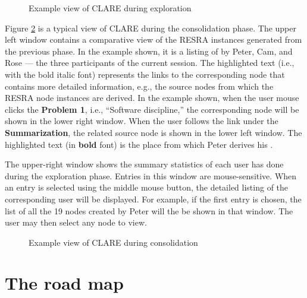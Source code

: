\begin{figure}[htb]
  \centerline{}
  \caption{Example view of CLARE during exploration}
  \label{fig:explore}
\end{figure}

Figure \ref{fig:consolidate} is a typical view of CLARE during the
consolidation phase. The upper left window contains a comparative view of
the RESRA instances generated from the previous phase. In the example
shown, it is a listing of  by Peter, Cam, and Rose
 --- the three participants of the current session.  The highlighted text
(i.e., with the bold italic font) represents the links to the corresponding
node that contains more detailed information, e.g., the source nodes from
which the RESRA node instances are derived. In the example shown, when the
user mouse clicks the {\bf Problem 1}, i.e., ``Software discipline,'' the
corresponding node will be shown in the lower right window. When the user
follows the link under the {\bf Summarization\/}, the related source node
is shown in the lower left window. The highlighted text (in {\bf bold}
font) is the place from which Peter derives his .

The upper-right window shows the summary statistics of each user has done
during the exploration phase. Entries in this window are
mouse-sensitive. When an entry is selected using the middle mouse button,
the detailed listing of the corresponding user will be displayed. For
example, if the first entry is chosen, the list of all the 19 nodes created
by Peter will the be shown in that window. The user may then select any
node to view.

\begin{figure}[htb]
  \centerline{}
  \caption{Example view of CLARE during consolidation}
  \label{fig:consolidate}
\end{figure}


\section{The road map}
\label{sec:roadmap}

